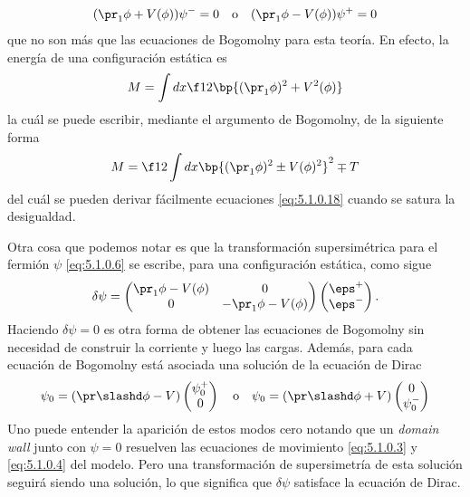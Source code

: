 \begin{align}
	(\pr_1\phi+V(\phi))\psi^-=0 \ \ \ \text{o} \ \ \ (\pr_1\phi-V(\phi))\psi^+=0 \label{eq:5.1.0.18}
\end{align}
que no son más que las ecuaciones de Bogomolny para esta teoría. En efecto, la energía de una configuración estática es
\begin{align}
	M = \int dx\f 12\bp{(\pr_1\phi)^2+V^2(\phi)}
\end{align}
la cuál se puede escribir, mediante el argumento de Bogomolny, de la siguiente forma
\begin{align}
	M = \f 12\int dx\bp{(\pr_1\phi)^2\pm V(\phi)^2}^2\mp T
\end{align}
del cuál se pueden derivar fácilmente ecuaciones \eqref{eq:5.1.0.18} cuando se satura la desigualdad.

Otra cosa que podemos notar es que la transformación supersimétrica para el fermión $\psi$ \eqref{eq:5.1.0.6} se escribe, para una configuración estática, como sigue
\begin{align}
	\delta\psi = \begin{pmatrix}
	\pr_1\phi-V(\phi) & 0\\
	0 & -\pr_1\phi- V(\phi)
	\end{pmatrix}\begin{pmatrix}
	\eps^+ \\ \eps^-
	\end{pmatrix}.
\end{align}
Haciendo $\delta\psi=0$ es otra forma de obtener las ecuaciones de Bogomolny sin necesidad de construir la corriente y luego las cargas. Además, para cada ecuación de Bogomolny está asociada una solución de la ecuación de Dirac
\begin{align}
	\psi_0 = (\pr\slashd\phi-V)\begin{pmatrix}
	\psi_0^+ \\ 0
	\end{pmatrix} \ \ \ \text{o} \ \ \ \psi_0 = (\pr\slashd\phi+V)\begin{pmatrix}
	0 \\ \psi_0^-
	\end{pmatrix} 
\end{align}
Uno puede entender la aparición de estos modos cero notando que un \emph{domain wall} junto con $\psi=0$ resuelven las ecuaciones de movimiento \eqref{eq:5.1.0.3} y \eqref{eq:5.1.0.4} del modelo. Pero una transformación de supersimetría de esta solución seguirá siendo una solución, lo que significa que $\delta\psi$ satisface la ecuación de Dirac.


